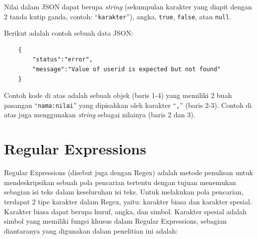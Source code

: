 Nilai dalam JSON dapat berupa \textit{string} (sekumpulan karakter yang diapit dengan 2 tanda kutip ganda, contoh: ``\texttt{karakter}''), angka, \texttt{true}, \texttt{false}, atau \texttt{null}.

Berikut adalah contoh sebuah data JSON:
\begin{lstlisting}
	{
		"status":"error",
		"message":"Value of userid is expected but not found"
	}
\end{lstlisting}

Contoh kode di atas adalah sebuah objek (baris 1-4) yang memiliki 2 buah pasangan ``\texttt{nama:nilai}'' yang dipisahkan oleh karakter ``\texttt{,}'' (baris 2-3). Contoh di atas juga menggunakan \textit{string} sebagai nilainya (baris 2 dan 3).

\section{Regular Expressions}
\label{sec:regex}
Regular Expressions (disebut juga dengan Regex) adalah metode penulisan untuk mendeskripsikan sebuah pola pencarian tertentu dengan tujuan menemukan sebagian isi teks dalam keseluruhan isi teks\cite{regex}. Untuk melakukan pola pencarian, terdapat 2 tipe karakter dalam Regex, yaitu: karakter biasa dan karakter spesial. Karakter biasa dapat berupa huruf, angka, dan simbol. Karakter spesial adalah simbol yang memiliki fungsi khusus dalam Regular Expressions, sebagian diantaranya yang digunakan dalam penelitian ini adalah: 
